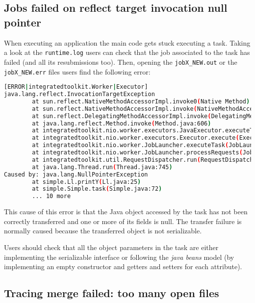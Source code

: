 \subsection{Jobs failed on reflect target invocation null pointer}
When executing an application the main code gets stuck executing a task. Taking a look at the \texttt{runtime.log} users can check
that the job associated to the task has failed (and all its resubmissions too). Then, opening the \texttt{jobX\_NEW.out} or the
\texttt{jobX\_NEW.err} files users find the following error:

\begin{lstlisting}[language=bash]
[ERROR|integratedtoolkit.Worker|Executor]
java.lang.reflect.InvocationTargetException
        at sun.reflect.NativeMethodAccessorImpl.invoke0(Native Method)
        at sun.reflect.NativeMethodAccessorImpl.invoke(NativeMethodAccessorImpl.java:57)
        at sun.reflect.DelegatingMethodAccessorImpl.invoke(DelegatingMethodAccessorImpl.java:43)
        at java.lang.reflect.Method.invoke(Method.java:606)
        at integratedtoolkit.nio.worker.executors.JavaExecutor.executeTask(JavaExecutor.java:154)
        at integratedtoolkit.nio.worker.executors.Executor.execute(Executor.java:42)
        at integratedtoolkit.nio.worker.JobLauncher.executeTask(JobLauncher.java:46)
        at integratedtoolkit.nio.worker.JobLauncher.processRequests(JobLauncher.java:34)
        at integratedtoolkit.util.RequestDispatcher.run(RequestDispatcher.java:46)
        at java.lang.Thread.run(Thread.java:745)
Caused by: java.lang.NullPointerException
        at simple.Ll.printY(Ll.java:25)
        at simple.Simple.task(Simple.java:72)
        ... 10 more
\end{lstlisting}

This cause of this error is that the Java object accessed by the task has not been correctly transferred and one or more of its fields
is null. The transfer failure is normally caused because the transferred object is not serializable. 

Users should check that all the object parameters in the task are either implementing the serializable interface or following 
the \textit{java beans} model (by implementing an empty constructor and getters and setters for each attribute).

\subsection{Tracing merge failed: too many open files}

